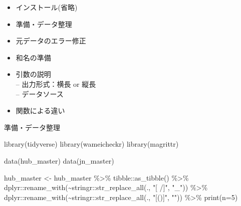 \documentclass[
  a5paper,
  landscape,
  notitlepage]{report}
\newenvironment{Shaded}{\begin{snugshade}}{\end{snugshade}}
\newcommand{\AttributeTok}[1]{\textcolor[rgb]{0.77,0.63,0.00}{#1}}
\newcommand{\DecValTok}[1]{\textcolor[rgb]{0.00,0.00,0.81}{#1}}
\newcommand{\FunctionTok}[1]{\textcolor[rgb]{0.00,0.00,0.00}{#1}}
\newcommand{\NormalTok}[1]{#1}
\newcommand{\OtherTok}[1]{\textcolor[rgb]{0.56,0.35,0.01}{#1}}
\newcommand{\SpecialCharTok}[1]{\textcolor[rgb]{0.00,0.00,0.00}{#1}}
\newcommand{\StringTok}[1]{\textcolor[rgb]{0.31,0.60,0.02}{#1}}
\providecommand{\tightlist}{%
  \setlength{\itemsep}{0pt}\setlength{\parskip}{0pt}}
\begin{document}
\begin{itemize}
\tightlist
\item
  インストール(省略)\\
\item
  準備・データ整理\\
\item
  元データのエラー修正\\
\item
  和名の準備\\
\item
  引数の説明\\
  -- 出力形式：横長 or 縦長\\
  -- データソース\\
\item
  関数による違い
\end{itemize}

\newpage

\fontsize{32pt}{32pt}\selectfont

\begin{center}
準備・データ整理
\end{center}

\fontsize{14pt}{14pt}\selectfont

\begin{Shaded}
\begin{Highlighting}[]
\FunctionTok{library}\NormalTok{(tidyverse)}
\FunctionTok{library}\NormalTok{(wameicheckr)}
\FunctionTok{library}\NormalTok{(magrittr)}
\end{Highlighting}
\end{Shaded}

\begin{Shaded}
\begin{Highlighting}[]
\FunctionTok{data}\NormalTok{(hub\_master)}
\FunctionTok{data}\NormalTok{(jn\_master)}

\NormalTok{hub\_master }\OtherTok{\textless{}{-}} 
\NormalTok{  hub\_master }\SpecialCharTok{\%\textgreater{}\%}
\NormalTok{  tibble}\SpecialCharTok{::}\FunctionTok{as\_tibble}\NormalTok{() }\SpecialCharTok{\%\textgreater{}\%}
\NormalTok{  dplyr}\SpecialCharTok{::}\FunctionTok{rename\_with}\NormalTok{(}\SpecialCharTok{\textasciitilde{}}\NormalTok{stringr}\SpecialCharTok{::}\FunctionTok{str\_replace\_all}\NormalTok{(., }\StringTok{"[ /]"}\NormalTok{, }\StringTok{"\_"}\NormalTok{)) }\SpecialCharTok{\%\textgreater{}\%}
\NormalTok{  dplyr}\SpecialCharTok{::}\FunctionTok{rename\_with}\NormalTok{(}\SpecialCharTok{\textasciitilde{}}\NormalTok{stringr}\SpecialCharTok{::}\FunctionTok{str\_replace\_all}\NormalTok{(., }\StringTok{"[()]"}\NormalTok{, }\StringTok{""}\NormalTok{)) }\SpecialCharTok{\%\textgreater{}\%}
  \FunctionTok{print}\NormalTok{(}\AttributeTok{n=}\DecValTok{5}\NormalTok{)}
\end{Highlighting}
\end{Shaded}
\end{document}
